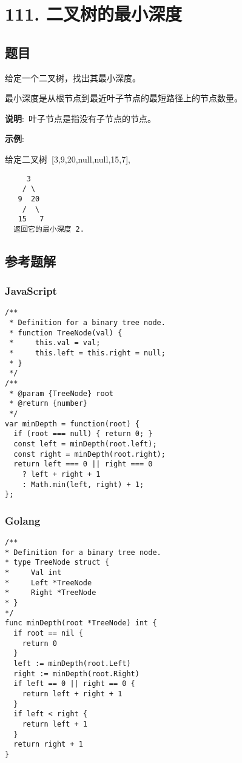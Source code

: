 \newpage
\section{111. 二叉树的最小深度}
\label{leetcode:111}

\subsection{题目}

给定一个二叉树，找出其最小深度。

最小深度是从根节点到最近叶子节点的最短路径上的节点数量。

\textbf{说明}: 叶子节点是指没有子节点的节点。

\textbf{示例}:

给定二叉树 [3,9,20,null,null,15,7],

\begin{verbatim}
     3
    / \
   9  20
    /  \
   15   7
  返回它的最小深度 2.
\end{verbatim}

\subsection{参考题解}

\subsubsection{JavaScript}

\begin{verbatim}
/**
 * Definition for a binary tree node.
 * function TreeNode(val) {
 *     this.val = val;
 *     this.left = this.right = null;
 * }
 */
/**
 * @param {TreeNode} root
 * @return {number}
 */
var minDepth = function(root) {
  if (root === null) { return 0; }
  const left = minDepth(root.left);
  const right = minDepth(root.right);
  return left === 0 || right === 0
    ? left + right + 1
    : Math.min(left, right) + 1;
};
\end{verbatim}

\subsubsection{Golang}

\begin{verbatim}
/**
* Definition for a binary tree node.
* type TreeNode struct {
*     Val int
*     Left *TreeNode
*     Right *TreeNode
* }
*/
func minDepth(root *TreeNode) int {
  if root == nil {
    return 0
  }
  left := minDepth(root.Left)
  right := minDepth(root.Right)
  if left == 0 || right == 0 {
    return left + right + 1
  }
  if left < right {
    return left + 1
  }
  return right + 1
}
\end{verbatim}

